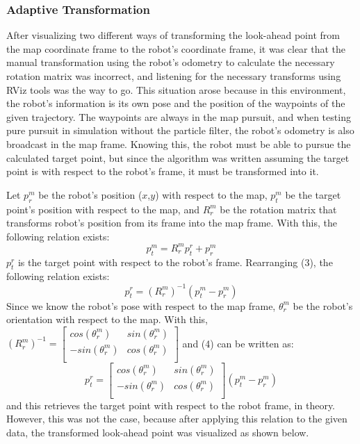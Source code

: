 \documentclass{article}
\begin{document}
\subsubsection{Adaptive Transformation}
After visualizing two different ways of transforming the look-ahead point from the map coordinate frame to the robot's coordinate frame, it was clear that the manual transformation using the robot's odometry to calculate the necessary rotation matrix was incorrect, and listening for the necessary transforms using RViz tools was the way to go. This situation arose because in this environment, the robot's information is its own pose and the position of the waypoints of the given trajectory. The waypoints are always in the map pursuit, and when testing pure pursuit in simulation without the particle filter, the robot's odometry is also broadcast in the map frame. Knowing this, the robot must be able to pursue the calculated target point, but since the algorithm was written assuming the target point is with respect to the robot's frame, it must be transformed into it. 

Let $p_r^m$ be the robot's position ($x$,$y$) with respect to the map, $p_t^m$ be the target point's position with respect to the map, and $R_r^m$ be the rotation matrix that transforms robot's position from its frame into the map frame. With this, the following relation exists:
\begin{equation}
    p_t^m = R_r^mp_t^r + p_r^m
\end{equation}
$p_t^r$ is the target point with respect to the robot's frame. Rearranging (3), the following relation exists:
\begin{equation}
    p_t^r = (R_r^m)^{-1}(p_t^m-p_r^m)
\end{equation}
Since we know the robot's pose with respect to the map frame, $\theta_r^m$ be the robot's orientation with respect to the map. With this, $(R_r^m)^{-1}=\begin{bmatrix}
    cos(\theta_r^m) & sin(\theta_r^m)\\
    -sin(\theta_r^m) & cos(\theta_r^m)\\
\end{bmatrix}$ and (4) can be written as:
\begin{equation}
    p_t^r = \begin{bmatrix}
    cos(\theta_r^m) & sin(\theta_r^m)\\
    -sin(\theta_r^m) & cos(\theta_r^m)\\
\end{bmatrix}(p_t^m-p_r^m)
\end{equation} and this retrieves the target point with respect to the robot frame, in theory. However, this was not the case, because after applying this relation to the given data, the transformed look-ahead point was visualized as shown below.
\end{document}
